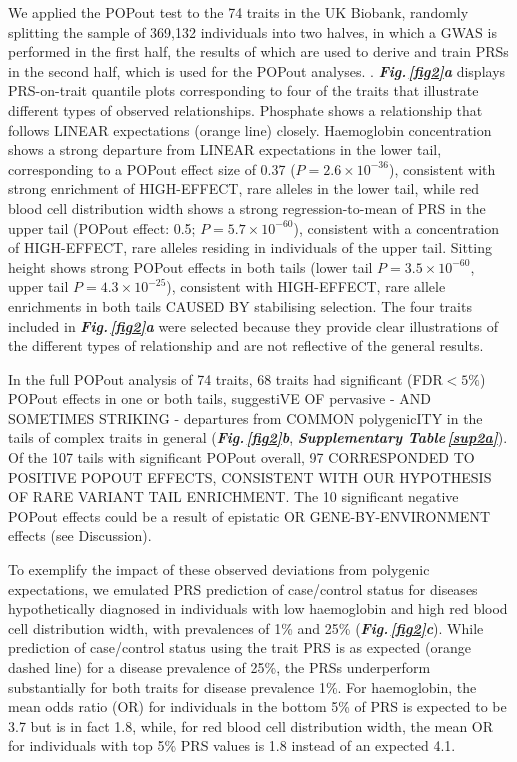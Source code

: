 \documentclass[12pt]{zHenriquesLab-StyleBioRxiv}
\newcommand\dref[2]{\normalsize{\textbf{\textit{Fig.\,\ref{#1}#2}}}\normalsize{}}
\newcommand\stref[1]{\normalsize{\textbf{\textit{Supplementary Table\,\ref{#1}}}}\normalsize{}}
\begin{document}
{{We applied the POPout test to the 74 traits in the UK Biobank, 
randomly splitting the sample of 369,132 individuals into two halves, 
in which a GWAS is performed in the first half, the results of which 
are used to derive and train PRSs in the second half, which is used 
for the POPout analyses. {\color{red}{The POPout test is performed in the same 
sample in which PRSs are trained, resulting in a conservative bias in 
POPout effects that we consider worthwhile to optimise sample 
size for testing in the tails (see Methods)}}. \dref{fig2}{a}  displays PRS-on-trait quantile plots corresponding 
to four of the traits that illustrate different types of 
observed relationships. Phosphate shows a relationship that 
follows LINEAR expectations (orange line) closely. 
Haemoglobin concentration shows a strong departure from 
LINEAR expectations in the lower tail, corresponding 
to a POPout effect size of 0.37 ($P = 2.6 \times 10^{-36}$), 
consistent with strong enrichment of HIGH-EFFECT, rare alleles in the lower 
tail, while red blood cell distribution width shows a strong 
regression-to-mean of PRS in the upper tail (POPout effect: 
0.5; $P = 5.7 \times 10^{-60}$), consistent with a concentration
of HIGH-EFFECT, rare alleles residing in individuals of 
the upper tail. Sitting height shows strong POPout effects in both 
tails (lower tail $P = 3.5 \times 10^{-60}$, upper 
tail $P = 4.3 \times 10^{-25}$), consistent with HIGH-EFFECT, rare allele 
enrichments in both tails CAUSED BY stabilising selection. The four 
traits included in \dref{fig2}{a}  were selected because they provide clear illustrations 
of the different types of relationship and are not reflective of 
the general results. 

In the full POPout analysis of 74 traits, 
68 traits had significant (FDR$<5\%$) POPout effects in one or both 
tails, suggestiVE OF pervasive - AND SOMETIMES STRIKING - departures from COMMON polygenicITY 
in the tails of complex traits in general (\dref{fig2}{b}, \stref{sup2a}). 
Of the 107 tails with significant 
POPout overall, 97 CORRESPONDED TO POSITIVE POPOUT 
EFFECTS, CONSISTENT WITH OUR HYPOTHESIS OF RARE 
VARIANT TAIL ENRICHMENT. The 10 significant negative POPout effects could be a result 
of epistatic OR GENE-BY-ENVIRONMENT effects (see Discussion).

To exemplify the impact of these observed deviations from 
polygenic expectations, we emulated PRS prediction of 
case/control status for diseases hypothetically diagnosed 
in individuals with low haemoglobin and high red blood cell 
distribution width, with prevalences of 1\% and 25\% (\dref{fig2}{c}). 
While prediction of case/control status using the trait PRS 
is as expected (orange dashed line) for a disease prevalence 
of 25\%, the PRSs underperform substantially for both 
traits for disease prevalence 1\%. For haemoglobin, the mean 
odds ratio (OR) for individuals in the bottom 5\% of PRS is 
expected to be 3.7 but is in fact 1.8, while, for red blood 
cell distribution width, the mean OR for individuals 
with top 5\% PRS values is 1.8 instead of an expected 4.1.
%
}}
\end{document}
